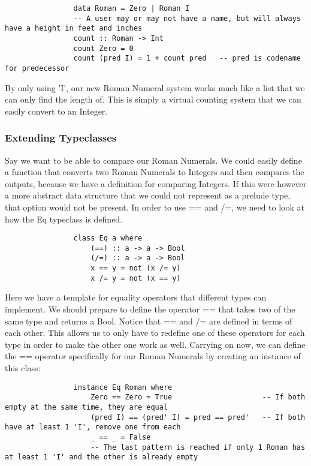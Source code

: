 \documentclass{article}
\begin{document}
            \begin{lstlisting}
                data Roman = Zero | Roman I
                -- A user may or may not have a name, but will always have a height in feet and inches
                count :: Roman -> Int
                count Zero = 0
                count (pred I) = 1 + count pred   -- pred is codename for predecessor
            \end{lstlisting}
            
            \medskip\noindent
            By only using 'I', our new Roman Numeral system works much like a list that we can only find the length of. This is simply a virtual counting system that we can easily convert to an Integer.
            
        \subsubsection{Extending Typeclasses}
            Say we want to be able to compare our Roman Numerals. We could easily define a function that converts two Roman Numerals to Integers and then compares the outputs, because we have a definition for comparing Integers. If this were however a more abstract data structure that we could not represent as a prelude type, that option would not be present. In order to use == and /=, we need to look at how the Eq typeclass is defined.
            \begin{lstlisting}
                class Eq a where  
                    (==) :: a -> a -> Bool  
                    (/=) :: a -> a -> Bool  
                    x == y = not (x /= y)  
                    x /= y = not (x == y)
            \end{lstlisting}
            
            \medskip\noindent
            Here we have a template for equality operators that different types can implement. We should prepare to define the operator == that takes two of the same type and returns a Bool. Notice that == and /= are defined in terms of each other. This allows us to only have to redefine one of these operators for each type in order to make the other one work as well. Carrying on now, we can define the == operator specifically for our Roman Numerals by creating an instance of this class:
            \begin{lstlisting}
                instance Eq Roman where  
                    Zero == Zero = True                     -- If both empty at the same time, they are equal
                    (pred I) == (pred' I) = pred == pred'   -- If both have at least 1 'I', remove one from each
                    _ == _ = False                          
                    -- The last pattern is reached if only 1 Roman has at least 1 'I' and the other is already empty
            \end{lstlisting}
            
\end{document}
